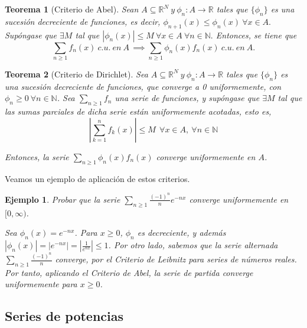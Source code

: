 \documentclass[11pt, a4paper]{article}
\theoremstyle{theorem-style}
\newtheorem{nth}{Teorema}[section]
\theoremstyle{definition-style}
\theoremstyle{remark-style}
\theoremstyle{example-style}
\newtheorem{ejemplo}{Ejemplo}[section]
\begin{document}
\begin{nth}[Criterio de Abel] \label{11} Sean $ A \subseteq \mathbb{R}^N\  y \ \phi_n : A \rightarrow \mathbb{R}$ tales que $\{\phi_n\}$ es una sucesión decreciente de funciones, es decir, $\phi_{n+1}(x) \leq \phi_n (x)\ \forall x \in A.$ Supóngase que $\exists M$ tal que $|\phi_n (x)| \leq M\ \forall x \in A\ \forall n \in \mathbb{N}.$ Entonces, se tiene que
  $$\sum_{n \ge 1} f_n(x)\ c. u.\ en\ A\, \implies \sum_{n \ge 1} \phi_n(x) f_n(x)\ c. u.\ en\ A.$$
\end{nth}

\begin{nth}[Criterio de Dirichlet] \label{12} Sea $A \subseteq \mathbb{R}^N\  y \ \phi_n : A \rightarrow \mathbb{R}$ tales que $\{\phi_n\}$ es una sucesión decreciente de funciones, que converge a 0 uniformemente, con $\phi_n \ge 0 \ \forall n \in \mathbb{N}$. Sea $\sum_{n \ge 1} f_n$ una serie de funciones, y supóngase que $\exists M$ tal que las sumas parciales de dicha serie están uniformemente acotadas, esto es, $$\left| \sum_{k=1}^n f_k(x) \right| \le M \ \ \forall x \in A, \ \forall n \in \mathbb{N}$$ 

  Entonces, la serie $\displaystyle \sum_{n\ge 1} \phi_n(x)f_n(x)$ converge uniformemente en $A$.
  
\end{nth}

Veamos un ejemplo de aplicación de estos criterios.

\begin{ejemplo}
  Probar que la serie $\displaystyle \sum_{n \ge 1} \frac{(-1)^n}{n} e^{-nx}$ converge uniformemente en $[0, \infty)$.
  
  Sea $\phi_n(x) = e^{-nx}$. Para $x \ge 0$, $\phi_n$ es decreciente, y además $|\phi_n(x)| = | e^{-nx} |  = |\frac{1}{e^{nx}} |\le 1$. Por otro lado, sabemos que la serie alternada $ \sum_{n \ge 1} \frac{(-1)^n}{n}$ converge, por el \textit{Criterio de Leibnitz} para series de números reales. Por tanto, aplicando el \textit{Criterio de Abel}, la serie de partida converge uniformemente para $x \ge 0$.  
\end{ejemplo}



\subsection{Series de potencias}
\end{document}
